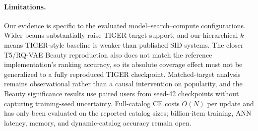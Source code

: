 \documentclass[letterpaper]{article}
\begin{document}
\paragraph{Limitations.}
Our evidence is specific to the evaluated model--search--compute
configurations. Wider beams substantially raise TIGER target support, and our
hierarchical-$k$-means TIGER-style baseline is weaker than published SID
systems. The closer T5/RQ-VAE Beauty reproduction also does not match the
reference implementation's ranking accuracy, so its absolute coverage effect
must not be generalized to a fully reproduced TIGER checkpoint. Matched-target
analysis remains observational rather than a causal intervention on
popularity, and the Beauty significance results use paired users from seed-42
checkpoints without capturing training-seed uncertainty. Full-catalog CE costs
$O(N)$ per update and has only been evaluated on the reported catalog sizes;
billion-item training, ANN latency, memory, and dynamic-catalog accuracy remain
open.


\end{document}

